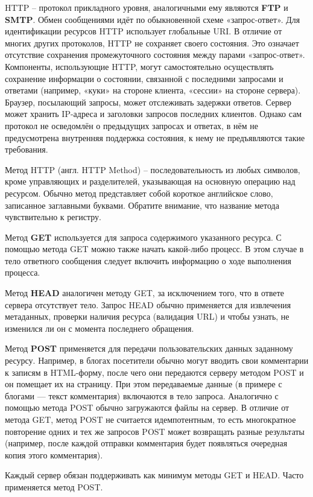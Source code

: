 \documentclass[a4paper]{article}
\begin{document}
HTTP -- протокол прикладного уровня, аналогичными ему являются \textbf{FTP} и \textbf{SMTP}. Обмен сообщениями идёт по обыкновенной схеме «запрос-ответ». Для идентификации ресурсов HTTP использует глобальные URI. В отличие от многих других протоколов, HTTP не сохраняет своего состояния. Это означает отсутствие сохранения промежуточного состояния между парами «запрос-ответ». Компоненты, использующие HTTP, могут самостоятельно осуществлять сохранение информации о состоянии, связанной с последними запросами и ответами (например, «куки» на стороне клиента, «сессии» на стороне сервера). Браузер, посылающий запросы, может отслеживать задержки ответов. Сервер может хранить IP-адреса и заголовки запросов последних клиентов. Однако сам протокол не осведомлён о предыдущих запросах и ответах, в нём не предусмотрена внутренняя поддержка состояния, к нему не предъявляются такие требования.

Метод HTTP (англ. HTTP Method) -- последовательность из любых символов, кроме управляющих и разделителей, указывающая на основную операцию над ресурсом. Обычно метод представляет собой короткое английское слово, записанное заглавными буквами. Обратите внимание, что название метода чувствительно к регистру.

Метод \textbf{GET} используется для запроса содержимого указанного ресурса. С помощью метода GET можно также начать какой-либо процесс. В этом случае в тело ответного сообщения следует включить информацию о ходе выполнения процесса.

Метод \textbf{HEAD} аналогичен методу GET, за исключением того, что в ответе сервера отсутствует тело. Запрос HEAD обычно применяется для извлечения метаданных, проверки наличия ресурса (валидация URL) и чтобы узнать, не изменился ли он с момента последнего обращения.

Метод \textbf{POST} применяется для передачи пользовательских данных заданному ресурсу. Например, в блогах посетители обычно могут вводить свои комментарии к записям в HTML-форму, после чего они передаются серверу методом POST и он помещает их на страницу. При этом передаваемые данные (в примере с блогами — текст комментария) включаются в тело запроса. Аналогично с помощью метода POST обычно загружаются файлы на сервер. В отличие от метода GET, метод POST не считается идемпотентным, то есть многократное повторение одних и тех же запросов POST может возвращать разные результаты (например, после каждой отправки комментария будет появляться очередная копия этого комментария).

Каждый сервер обязан поддерживать как минимум методы GET и HEAD. Часто применяется метод POST.
\end{document}
